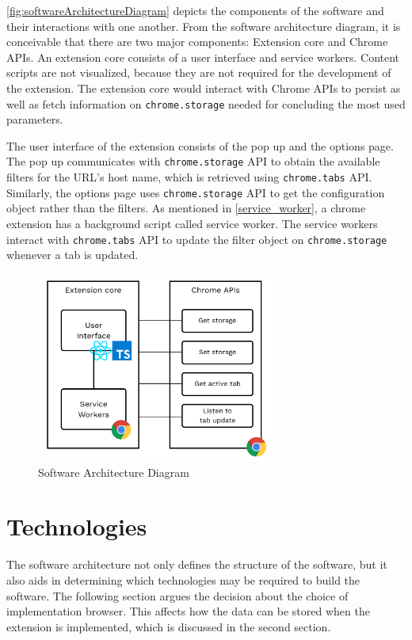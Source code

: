 \autoref{fig:softwareArchitectureDiagram} depicts the components of the software and their interactions with one another. From the software architecture diagram, it is conceivable that there are two major components: Extension core and Chrome APIs. An extension core consists of a user interface and service workers. Content scripts are not visualized, because they are not required for the development of the extension. The extension core would interact with Chrome APIs to persist as well as fetch information on \texttt{chrome.storage} needed for concluding the most used parameters.

The user interface of the extension consists of the pop up and the options page. The pop up communicates with \texttt{chrome.storage} API to obtain the available filters for the URL's host name, which is retrieved using \texttt{chrome.tabs} API. Similarly, the options page uses \texttt{chrome.storage} API to get the configuration object rather than the filters. As mentioned in \autoref{service_worker}, a chrome extension has a background script called service worker. The service workers interact with \texttt{chrome.tabs} API to update the filter object on \texttt{chrome.storage} whenever a tab is updated.

\begin{figure}
  \centering
  \includegraphics[width=0.7\textwidth]{assets/software_architecture_diagram.png}
  \caption{Software Architecture Diagram}
  \label{fig:softwareArchitectureDiagram}
\end{figure}


\section{Technologies}
\label{technologies_used}
The software architecture not only defines the structure of the software, but it also aids in determining which technologies may be required to build the software. The following section argues the decision about the choice of implementation browser. This affects how the data can be stored when the extension is implemented, which is discussed in the second section.

